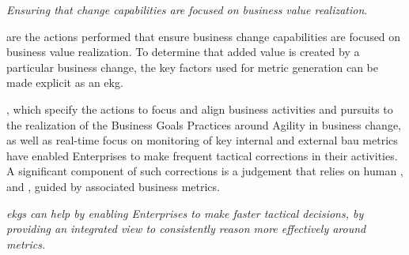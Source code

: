 \textit{Ensuring that change capabilities are focused on business value realization}.

 are the actions performed that ensure business change capabilities are
focused on business value realization.
To determine that added value is created by a particular business change, the key factors used for metric generation
can be made explicit as an \gls{ekg}.

, which specify the actions to focus and align
business activities and pursuits to the realization of the Business Goals Practices around Agility in
business change, as well as real-time focus on monitoring of key internal and external \gls{bau} metrics have enabled
Enterprises to make frequent tactical corrections in their activities.
A significant component of such corrections is a judgement that relies on human , 
and , guided by associated business metrics.

\textit{\Glspl{ekg} can help by enabling Enterprises to make faster tactical decisions, by providing an integrated view to
consistently reason more effectively around metrics.}
